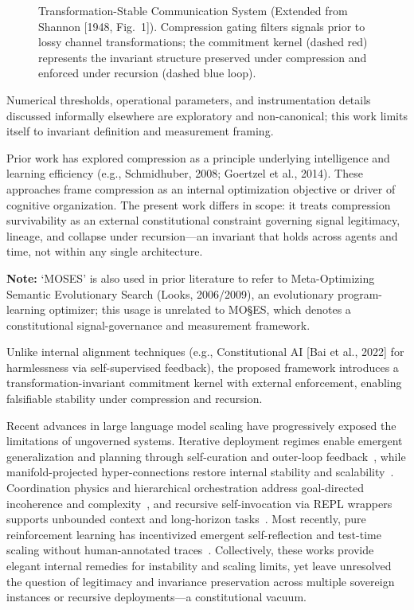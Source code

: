 \documentclass[11pt,a4paper]{article}
\begin{document}
\begin{figure}[htbp]
    \centering
    \resizebox{\linewidth}{!}{}
    \caption{Transformation-Stable Communication System (Extended from Shannon [1948, Fig.~1]). Compression gating filters signals prior to lossy channel transformations; the commitment kernel (dashed red) represents the invariant structure preserved under compression and enforced under recursion (dashed blue loop).}
    \label{fig:Comm_Sys}
\end{figure}

Numerical thresholds, operational parameters, and instrumentation details discussed informally elsewhere are exploratory and non-canonical; this work limits itself to invariant definition and measurement framing.

Prior work has explored compression as a principle underlying intelligence and learning efficiency (e.g., Schmidhuber, 2008; Goertzel et al., 2014). These approaches frame compression as an internal optimization objective or driver of cognitive organization. The present work differs in scope: it treats compression survivability as an external constitutional constraint governing signal legitimacy, lineage, and collapse under recursion---an invariant that holds across agents and time, not within any single architecture.

\textbf{Note:} `MOSES' is also used in prior literature to refer to Meta-Optimizing Semantic Evolutionary Search (Looks, 2006/2009), an evolutionary program-learning optimizer; this usage is unrelated to MO\S{}ES\texttrademark{}, which denotes a constitutional signal-governance and measurement framework.

Unlike internal alignment techniques (e.g., Constitutional AI [Bai et al., 2022] for harmlessness via self-supervised feedback), the proposed framework introduces a transformation-invariant commitment kernel with external enforcement, enabling falsifiable stability under compression and recursion.

Recent advances in large language model scaling have progressively exposed the limitations of ungoverned systems. Iterative deployment regimes enable emergent generalization and planning through self-curation and outer-loop feedback~\cite{correa2025}, while manifold-projected hyper-connections restore internal stability and scalability~\cite{xie2025}. Coordination physics and hierarchical orchestration address goal-directed incoherence and complexity~\cite{chang2025}, and recursive self-invocation via REPL wrappers supports unbounded context and long-horizon tasks~\cite{zhang2025}. Most recently, pure reinforcement learning has incentivized emergent self-reflection and test-time scaling without human-annotated traces~\cite{guo2025}. Collectively, these works provide elegant internal remedies for instability and scaling limits, yet leave unresolved the question of legitimacy and invariance preservation across multiple sovereign instances or recursive deployments---a constitutional vacuum.
\end{document}
